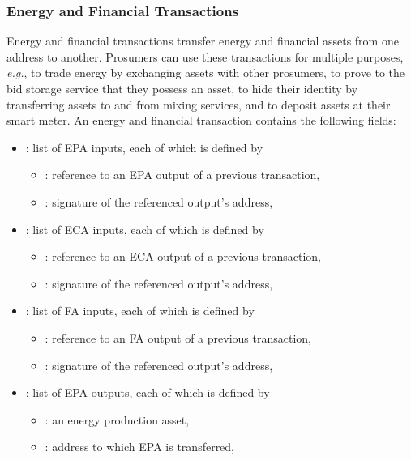 \subsubsection{Energy and Financial Transactions}

Energy and financial transactions transfer energy and financial assets
from one address to another.  Prosumers can use these transactions for
multiple purposes, {\em e.g.}, to trade energy by exchanging assets
with other prosumers, to prove to the bid storage service that they
possess an asset, to hide their identity by transferring assets to and
from mixing services, and to deposit assets at their smart meter.
%
An energy and financial transaction contains the following fields:
\begin{itemize}[noitemsep,topsep=-\parskip]
\item {}: list of EPA inputs, each of which is defined by
\begin{itemize}[leftmargin=0.5em,nosep]
\item {}: reference to an EPA output of a previous transaction,
\item {}: signature of the referenced output's address,
\end{itemize}
\item {}: list of ECA inputs, each of which is defined by
\begin{itemize}[leftmargin=0.5em,nosep]
\item {}: reference to an ECA output of a previous transaction,
\item {}: signature of the referenced output's address,
\end{itemize}
\item {}: list of FA inputs, each of which is defined by
\begin{itemize}[leftmargin=0.5em,nosep]
\item {}: reference to an FA output of a previous transaction,
\item {}: signature of the referenced output's address,
\end{itemize}
\item {}: list of EPA outputs, each of which is defined by
\begin{itemize}[leftmargin=0.5em,nosep]
\item {}: an energy production asset,
\item {}: address to which EPA is transferred,
\end{itemize}

\end{itemize}
